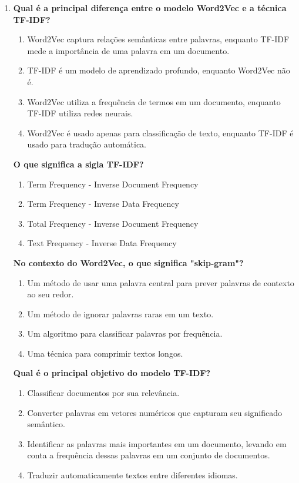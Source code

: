 \documentclass[14pt,a4paper,oneside]{book}
\begin{document}
\begin{enumerate}
\item \textbf{Qual é a principal diferença entre o modelo Word2Vec e a técnica TF-IDF?}
\begin{enumerate}[label=\alph*)]
\item Word2Vec captura relações semânticas entre palavras, enquanto TF-IDF mede a importância de uma palavra em um documento.
\item TF-IDF é um modelo de aprendizado profundo, enquanto Word2Vec não é.
\item Word2Vec utiliza a frequência de termos em um documento, enquanto TF-IDF utiliza redes neurais.
\item Word2Vec é usado apenas para classificação de texto, enquanto TF-IDF é usado para tradução automática.
\end{enumerate}

\textbf{O que significa a sigla TF-IDF?}
\begin{enumerate}[label=\alph*)]
\item Term Frequency - Inverse Document Frequency
\item Term Frequency - Inverse Data Frequency
\item Total Frequency - Inverse Document Frequency
\item Text Frequency - Inverse Data Frequency 
\end{enumerate}

\textbf{No contexto do Word2Vec, o que significa "skip-gram"?} 
\begin{enumerate}[label=\alph*)]
\item Um método de usar uma palavra central para prever palavras de contexto ao seu redor.
\item Um método de ignorar palavras raras em um texto.
\item Um algoritmo para classificar palavras por frequência.
\item Uma técnica para comprimir textos longos.
\end{enumerate}

\textbf{Qual é o principal objetivo do modelo TF-IDF?}
\begin{enumerate}[label=\alph*)]
\item Classificar documentos por sua relevância.
\item Converter palavras em vetores numéricos que capturam seu significado semântico.
\item Identificar as palavras mais importantes em um documento, levando em conta a frequência dessas palavras em um conjunto de documentos.
\item Traduzir automaticamente textos entre diferentes idiomas. 
\end{enumerate}


\end{enumerate}
\end{document}
